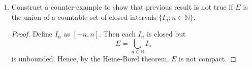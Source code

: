 \documentclass[12pt]{amsart}
\begin{document}
\begin{enumerate}
\begin{proof}
\end{proof}

\item Construct a counter-example to show that previous result is not true if $E$ is the union
  of a countable set of closed intervals $\{I_n : n \in \mathbb N \}$.  

\begin{proof}
Define $I_n$ as $[-n,n]$. Then each $I_n$ is closed but
\[ E = \bigcup_{n\in\mathbb N} I_n \]
is unbounded. Hence, by the Heine-Borel theorem, $E$ is not compact.
\end{proof}

\end{enumerate}
\end{document}
